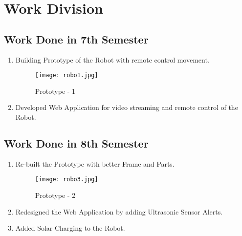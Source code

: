 \chapter{Work Division}
\section{Work Done in 7th Semester}
\begin{enumerate}
\item Building Prototype of the Robot with remote control movement.
\begin{figure}[h]
\centering
\texttt{[image: robo1.jpg]}
\caption{Prototype - 1}
\end{figure}
\item Developed Web Application for video streaming and remote control of the Robot. 
\end{enumerate}

\newpage
\section{Work Done in 8th Semester}
\begin{enumerate}
\item Re-built the Prototype with better Frame and Parts.
\begin{figure}[h]
\centering
\texttt{[image: robo3.jpg]}
\caption{Prototype - 2}
\end{figure}
\item Redesigned the Web Application by adding Ultrasonic Sensor Alerts. 
\item Added Solar Charging to the Robot.
\end{enumerate}
